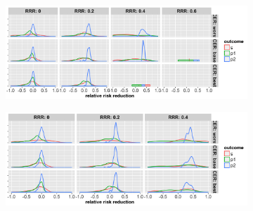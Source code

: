 \documentclass[]{article}
\begin{document}
\begin{figure}
\centering
  \caption{Distribution of relative risk reduction estimates after stopping early for futility of (a) B.I. or (b) L.P.
  Results are presented for the three control event rates by rows, four relative risk reductions (by columns) and the
  three outcomes (legend).}
  \begin{subfigure}{0.8\textwidth}
    \centering
    \caption{}
    \includegraphics{../plots/3arm/RRRhat_futbi_3arm.png}
  \end{subfigure}
  \bigbreak
  \begin{subfigure}{0.8\textwidth}
    \centering
    \caption{}
    \includegraphics{../plots/3arm/RRRhat_futlp_3arm.png}
  \end{subfigure}
\end{figure}
\end{document}
